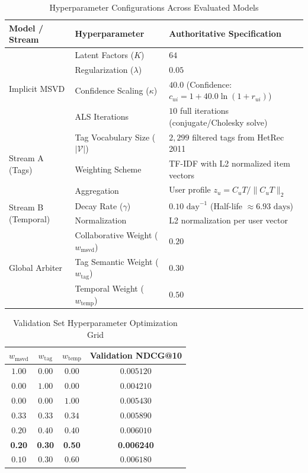 \documentclass[conference]{IEEEtran}
\begin{document}
\begin{table}[t]
\caption{Hyperparameter Configurations Across Evaluated Models}
\label{tab:hyperparams}
\centering
\begin{tabular}{llp{9.5cm}}
\toprule
\textbf{Model / Stream} & \textbf{Hyperparameter} & \textbf{Authoritative Specification} \\
\midrule
\multirow{4}{*}{Implicit MSVD} & Latent Factors ($K$) & $64$ \\
& Regularization ($\lambda$) & $0.05$ \\
& Confidence Scaling ($\kappa$) & $40.0$ (Confidence: $c_{ui} = 1 + 40.0 \ln(1 + r_{ui})$) \\
& ALS Iterations & $10$ full iterations (conjugate/Cholesky solve) \\
\midrule
\multirow{3}{*}{Stream A (Tags)} & Tag Vocabulary Size ($|\mathcal{V}|$) & $2,299$ filtered tags from HetRec 2011 \\
& Weighting Scheme & TF-IDF with L2 normalized item vectors \\
& Aggregation & User profile $z_u = C_u T / \|C_u T\|_2$ \\
\midrule
\multirow{2}{*}{Stream B (Temporal)} & Decay Rate ($\gamma$) & $0.10\text{ day}^{-1}$ (Half-life $\approx 6.93\text{ days}$) \\
& Normalization & L2 normalization per user vector \\
\midrule
\multirow{3}{*}{Global Arbiter} & Collaborative Weight ($w_{\text{msvd}}$) & $0.20$ \\
& Tag Semantic Weight ($w_{\text{tag}}$) & $0.30$ \\
& Temporal Weight ($w_{\text{temp}}$) & $0.50$ \\
\bottomrule
\end{tabular}
\end{table}

\begin{table}[t]
\caption{Validation Set Hyperparameter Optimization Grid}
\label{tab:val_grid}
\centering
\begin{tabular}{cccc}
\toprule
$w_{\text{msvd}}$ & $w_{\text{tag}}$ & $w_{\text{temp}}$ & Validation NDCG@10 \\
\midrule
$1.00$ & $0.00$ & $0.00$ & $0.005120$ \\
$0.00$ & $1.00$ & $0.00$ & $0.004210$ \\
$0.00$ & $0.00$ & $1.00$ & $0.005430$ \\
$0.33$ & $0.33$ & $0.34$ & $0.005890$ \\
$0.20$ & $0.40$ & $0.40$ & $0.006010$ \\
\textbf{0.20} & \textbf{0.30} & \textbf{0.50} & \textbf{0.006240} \\
$0.10$ & $0.30$ & $0.60$ & $0.006180$ \\
\bottomrule
\end{tabular}
\end{table}
\end{document}
